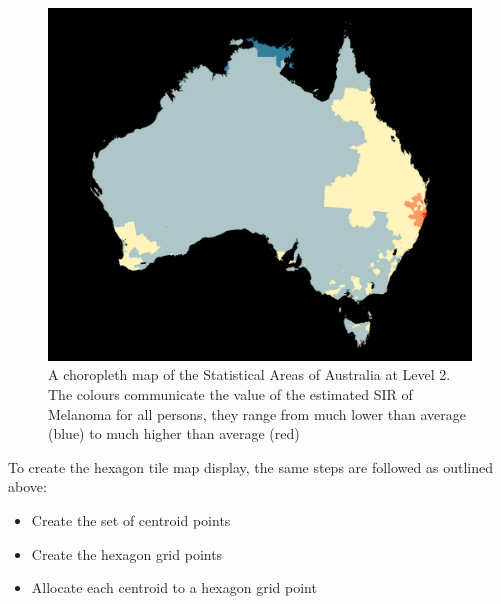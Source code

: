 \documentclass{monashthesis}
\begin{document}
\begin{figure}[H]
\centering
\includegraphics[width=14cm]{figures/03-algorithm/aus_melanoma_p.pdf}
\caption{\label{fig:melanoma-geo}A choropleth map of the Statistical Areas of Australia at Level 2. The colours communicate the value of the estimated SIR of Melanoma for all persons, they range from much lower than average (blue) to much higher than average (red)}
\end{figure}

To create the hexagon tile map display, the same steps are followed as outlined above:

\begin{itemize}
\tightlist
\item
  Create the set of centroid points
\item
  Create the hexagon grid points
\item
  Allocate each centroid to a hexagon grid point
\end{itemize}
\end{document}
